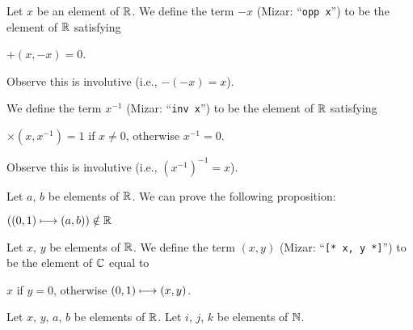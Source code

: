 \documentclass{article}
\begin{document}
\begin{definition}
Let $x$ be an element of $\mathbb{R}$.
We define the term $-x$ (Mizar: ``\verb#opp x#'') to be the element of
$\mathbb{R}$ satisfying
\begin{defn}
\item $+(x,-x)=0$.
\end{defn}
Observe this is involutive (i.e., $-(-x)=x$).

We define the term $x^{-1}$ (Mizar: ``\verb#inv x#'') to be the element
of $\mathbb{R}$ satisfying
\begin{defn}
\item $\times(x,x^{-1})=1$ if $x\neq0$, otherwise $x^{-1}=0$.
\end{defn}
Observe this is involutive (i.e., $(x^{-1})^{-1}=x$).
\end{definition}

Let $a$, $b$ be elements of $\mathbb{R}$. We can prove the following proposition:
\begin{thm}
\item\label{arytm0:8} $((0,1)\longmapsto(a,b))\notin\mathbb{R}$
\end{thm}

\begin{definition}
Let $x$, $y$ be elements of $\mathbb{R}$.
We define the term $(x,y)$ (Mizar: ``\verb#[* x, y *]#'') to be the
element of $\mathbb{C}$ equal to
\begin{defn}
\item $x$ if $y=0$, otherwise $(0,1)\longmapsto(x,y)$.
\end{defn}
\end{definition}

Let $x$, $y$, $a$, $b$ be elements of $\mathbb{R}$. Let $i$, $j$, $k$ be
elements of $\mathbb{N}$.
\end{document}
